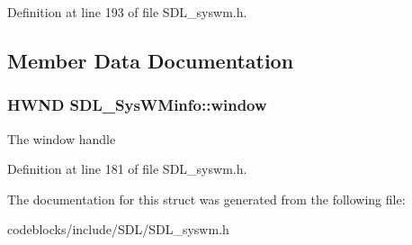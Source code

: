 Definition at line 193 of file S\+D\+L\+\_\+syswm.\+h.



\subsection{Member Data Documentation}
\hypertarget{structSDL__SysWMinfo_af06225591ff07e837bbd037728a525b9}{
\subsubsection[{window}]{\setlength{\rightskip}{0pt plus 5cm}H\+W\+N\+D S\+D\+L\+\_\+\+Sys\+W\+Minfo\+::window}}\label{structSDL__SysWMinfo_af06225591ff07e837bbd037728a525b9}
The window handle 

Definition at line 181 of file S\+D\+L\+\_\+syswm.\+h.



The documentation for this struct was generated from the following file\+:\begin{DoxyCompactItemize}
\item 
codeblocks/include/\+S\+D\+L/S\+D\+L\+\_\+syswm.\+h\end{DoxyCompactItemize}
